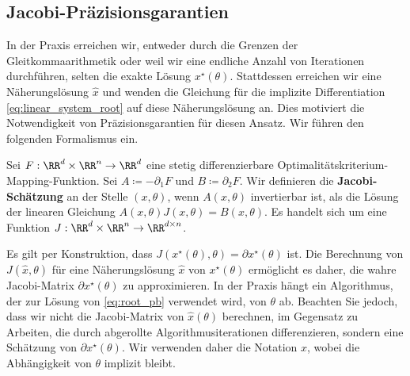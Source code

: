 \subsection{Jacobi-Präzisionsgarantien}
\label{sec:jac_bounds}


In der Praxis erreichen wir, entweder durch die Grenzen der Gleitkommaarithmetik oder weil wir eine endliche Anzahl von Iterationen durchführen, selten die exakte Lösung $x^\star(\theta)$. Stattdessen erreichen wir eine Näherungslösung $\hat{x}$ und wenden die Gleichung für die implizite Differentiation \eqref{eq:linear_system_root} auf diese Näherungslösung an. Dies motiviert die Notwendigkeit von Präzisionsgarantien für diesen Ansatz. Wir führen den folgenden Formalismus ein.

\begin{definition}
\label{DEF:jac-est}
Sei $F:\RR^d \times \RR^n \to \RR^d$ eine stetig differenzierbare Optimalitätskriterium-Mapping-Funktion.
Sei $A \coloneqq -\partial_1 F$ und $B \coloneqq \partial_2 F$.
Wir definieren die \textbf{Jacobi-Schätzung} an der Stelle $(x, \theta)$, wenn $A(x,\theta)$ invertierbar ist, als die Lösung der linearen Gleichung
$A(x, \theta) J(x, \theta) = B(x, \theta)$.
Es handelt sich um eine Funktion $J: \RR^d \times \RR^n \to \RR^{d \times n}$.
\end{definition}
Es gilt per Konstruktion, dass
$J(x^\star(\theta), \theta) = \partial x^\star(\theta)$ ist.
Die Berechnung von $J(\hat x, \theta)$ für eine Näherungslösung $\hat x$ von $x^\star(\theta)$ ermöglicht es daher, die wahre Jacobi-Matrix $\partial x^\star(\theta)$ zu approximieren. In der Praxis hängt ein Algorithmus, der zur Lösung von \eqref{eq:root_pb} verwendet wird, von $\theta$ ab. Beachten Sie jedoch, dass wir nicht die Jacobi-Matrix von $\hat x(\theta)$ berechnen, im Gegensatz zu Arbeiten, die durch abgerollte Algorithmusiterationen differenzieren, sondern eine Schätzung von $\partial x^\star(\theta)$. Wir verwenden daher die Notation $\hat x$, wobei die Abhängigkeit von $\theta$ implizit bleibt.

